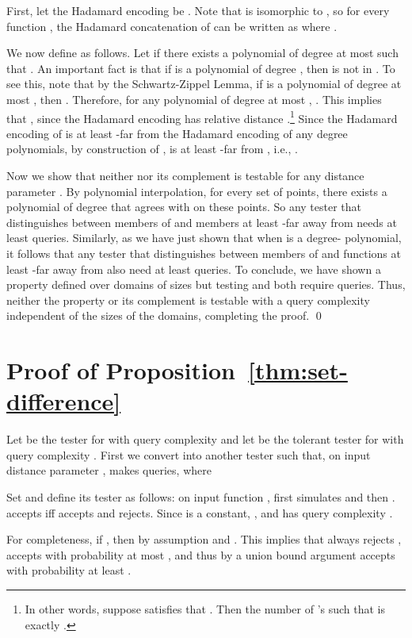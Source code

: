 \documentclass[11pt,english]{article}
\theoremstyle{definition}
\theoremstyle{remark}
\begin{document}
First, let the Hadamard encoding  be
.
Note that  is isomorphic to , 
so for every function , 
the Hadamard concatenation of  can be written as 
where .

We now define  as follows. Let  
if there exists a polynomial  
of degree at most  such that . 
An important fact is that 
if  is a polynomial of degree , 
then  is not in . 
To see this, note that by the Schwartz-Zippel Lemma, 
if  is a polynomial of degree 
at most , then  . 
Therefore, for any polynomial  of degree at most , 
.
This implies that , 
since the Hadamard encoding has relative distance .\footnote{In other words, suppose  satisfies that 
. Then the number of 's such that 
 is exactly .}
Since the Hadamard encoding of  is at least -far 
from the Hadamard encoding of any degree  polynomials, 
by construction of ,  is at least -far from , 
i.e., .

Now we show that neither  nor its complement is testable for 
any distance parameter . 
By polynomial interpolation, for every set of  points, 
there exists a polynomial of degree  that agrees with  on these points.
So any tester that distinguishes between members of  
and members at least -far away from  needs at least  queries. 
Similarly, as we have just shown that 
when  is a degree- polynomial,
it follows that any tester that distinguishes between members of  
and functions at least -far away from  
also need at least  queries. 
To conclude, we have shown a property 
defined over domains of sizes 
but testing  and 
both require  queries.
Thus, neither the property or its complement 
is testable with a query complexity independent of the sizes of the domains, 
completing the proof. 
\qed




\section{Proof of Proposition~\ref{thm:set-difference}}

\label{Sec:set-difference} 
Let  be the tester for  with query complexity  
and let  be the tolerant tester for  with query complexity . 
First we convert  into another tester  such that, 
on input distance parameter ,  makes  queries, where



Set  and define its tester  as follows:
on input function ,  first simulates  and then . 
 accepts iff  accepts and  rejects. 
Since  is a constant, , and  has query complexity .

For completeness, if , then by assumption 
and . 
This implies that  always rejects ,  accepts  with
probability at most , and thus by a union bound argument  accepts  with probability at least .
\end{document}
